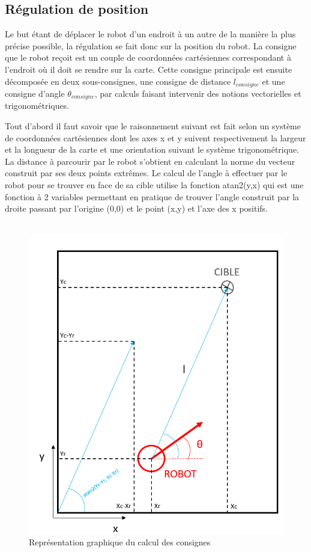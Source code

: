 \documentclass[a4paper,11pt]{article}
\begin{document}
\subsection{Régulation de position}

Le but étant de déplacer le robot d'un endroit à un autre de la manière la plus précise possible, la régulation se fait donc sur la position du robot. La consigne que le robot reçoit est un couple de coordonnées cartésiennes correspondant à l'endroit où il doit se rendre sur la carte. Cette consigne principale est ensuite décomposée en deux sous-consignes, une consigne de distance $l_{consigne}$ et une consigne d'angle $\theta_{consigne}$, par calculs faisant intervenir des notions vectorielles et trigonométriques.

Tout d'abord il faut savoir que le raisonnement suivant est fait selon un système de coordonnées cartésiennes dont les axes x et y suivent respectivement la largeur et la longueur de la carte et une orientation suivant le système trigonométrique. La distance à parcourir par le robot s'obtient en calculant la norme du vecteur construit par ses deux points extrêmes. Le calcul de l'angle à effectuer par le robot pour se trouver en face de sa cible utilise la fonction atan2(y,x) qui est une fonction à 2 variables permettant en pratique de trouver l'angle construit par la droite passant par l'origine (0,0) et le point (x,y) et l'axe des x positifs.\cite{cochelin_positionnement_nodate}\\\\
\begin{figure}[H]
    \centering
    \includegraphics[scale = 1]{atan2.PNG}
    \caption{Représentation graphique du calcul des consignes}
    \label{fig:atan}
\end{figure}\\
\end{document}
